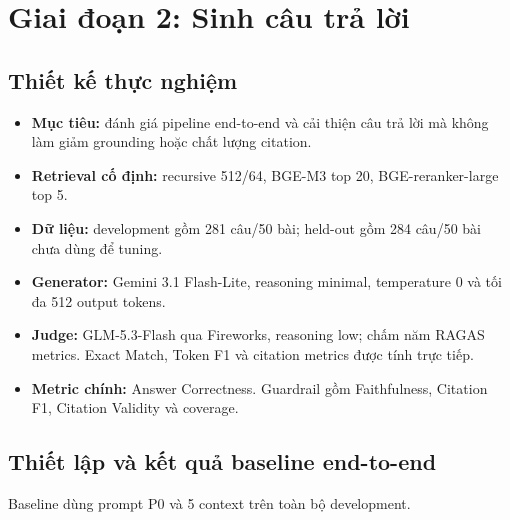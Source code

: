 \section{Giai đoạn 2: Sinh câu trả lời}

\subsection{Thiết kế thực nghiệm}

\begin{itemize}
  \item \textbf{Mục tiêu:} đánh giá pipeline end-to-end và cải thiện câu trả
  lời mà không làm giảm grounding hoặc chất lượng citation.
  \item \textbf{Retrieval cố định:} recursive 512/64, BGE-M3 top 20,
  BGE-reranker-large top 5.
  \item \textbf{Dữ liệu:} development gồm 281 câu/50 bài; held-out gồm 284
  câu/50 bài chưa dùng để tuning.
  \item \textbf{Generator:} Gemini 3.1 Flash-Lite, reasoning minimal,
  temperature 0 và tối đa 512 output tokens.
  \item \textbf{Judge:} GLM-5.3-Flash qua Fireworks, reasoning low; chấm năm
  RAGAS metrics. Exact Match, Token F1 và citation metrics được tính trực tiếp.
  \item \textbf{Metric chính:} Answer Correctness. Guardrail gồm
  Faithfulness, Citation F1, Citation Validity và coverage.
\end{itemize}

\subsection{Thiết lập và kết quả baseline end-to-end}

Baseline dùng prompt P0 và 5 context trên toàn bộ development.

